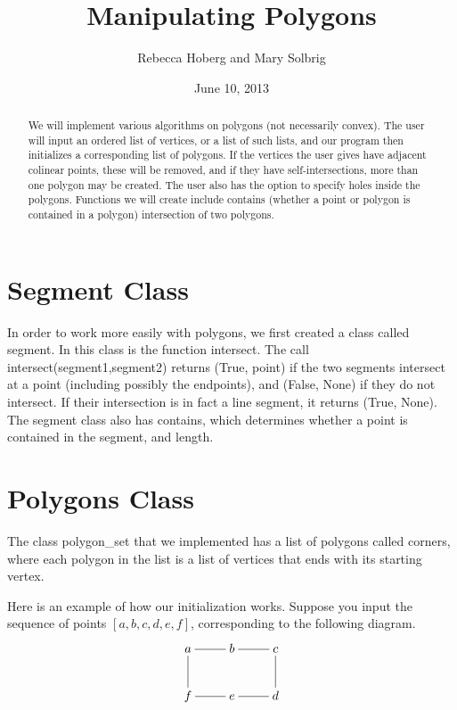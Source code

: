 \documentclass[11pt]{amsart}
\title{Manipulating Polygons}
\author{Rebecca Hoberg and Mary Solbrig}
\date{June 10, 2013}
\theoremstyle{definition}
\theoremstyle{remark}
\numberwithin{equation}{section}
\begin{document}
\begin{abstract}

We will implement various algorithms on polygons (not necessarily convex).
The user will input an ordered list of vertices, or a list of such lists, and our program then initializes a corresponding list of polygons.
If the vertices the user gives have adjacent colinear points, these will be removed, and if they have self-intersections, more than one polygon may be created. 
The user also has the option to specify holes inside the polygons.
Functions we will create include contains (whether a point or polygon is contained in a polygon) intersection of two polygons. 

\end{abstract}

\maketitle

\tableofcontents

\section{Segment Class}

In order to work more easily with polygons, we first created a class called segment. In this class is the function intersect. The call intersect(segment1,segment2) returns (True, point) if the two segments intersect at a point (including possibly the endpoints), and (False, None) if they do not intersect.
If their intersection is in fact a line segment, it returns (True, None).
The segment class also has contains, which determines whether a point is contained in the segment, and length.

\section{Polygons Class}
The class polygon\_set that we implemented has a list of polygons called corners, where each polygon in the list is a list of vertices that ends with its starting vertex. 

Here is an example of how our initialization works. Suppose you input the sequence of points $[a,b,c,d,e,f]$, corresponding to the following diagram.
\[\xymatrix{
a \ar@{-}[r]  \ar@{-}[d]  & b \ar @{-}[r] & c \ar@{-}[d] \\
f \ar@{-}[r] & e\ar@{-}[r] & d\\} \]
\end{document}
